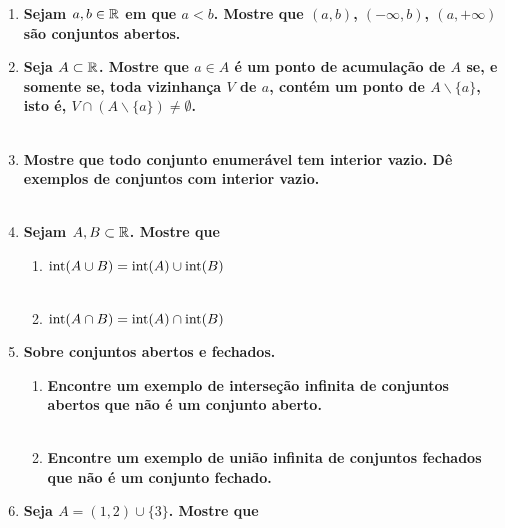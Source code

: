 \documentclass[%
  a4paper,%
  12pt,%
  fleqn,%
  english,%
  brazilian,%
]{article}
\begin{document}
\begin{enumerate}[wide, labelwidth=!, labelindent=0pt]
	\item \textbf{Sejam $a, b \in \mathbb R$ em que $a<b$. Mostre que $(a, b)$, $(-\infty, b)$, $(a, +\infty)$ são conjuntos abertos.}\\
	\newpage
	\item \textbf{Seja $A\subset \mathbb R$. Mostre que $a \in A$ é um ponto de acumulação de $A$ se, e somente se, toda vizinhança $V$ de $a$, contém um ponto de $A\backslash \{a\}$, isto é, $V \cap (A \backslash \{a\}) \neq \emptyset$.}\\
	\\
	\item \textbf{Mostre que todo conjunto enumerável tem interior vazio. Dê exemplos de conjuntos com interior vazio.}\\
	\\
	\item \textbf{Sejam $A, B \subset \mathbb R$. Mostre que}
	\begin{enumerate}[label=\alph*)]
		\item $\text{int}(A \cup B) = \text{int}(A) \cup \text{int}(B)$\\
		\\
		\item $\text{int}(A \cap B) = \text{int}(A) \cap \text{int}(B)$\\
	\end{enumerate}
	\vspace{3mm}
	\item \textbf{Sobre conjuntos abertos e fechados.}
	\begin{enumerate}[label=\alph*)]
		\item \textbf{Encontre um exemplo de interseção infinita de conjuntos abertos que não é um conjunto aberto.}\\
		\\
		\item \textbf{Encontre um exemplo de união infinita de conjuntos fechados que não é um conjunto fechado.}\\
	\end{enumerate}
	\vspace{3mm}
	\item \textbf{Seja $A = (1, 2)\cup\{3\}$. Mostre que}

\end{enumerate}
\end{document}
